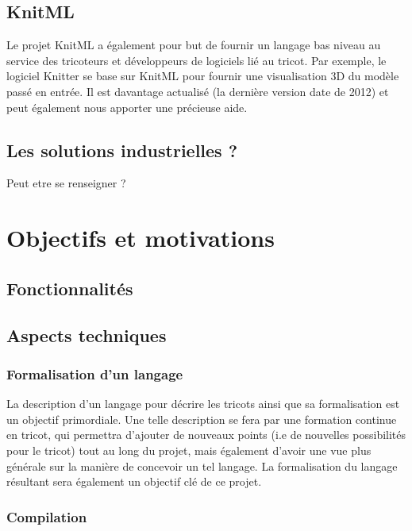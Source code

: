 \documentclass{article}
\begin{document}
\subsection{KnitML}

Le projet KnitML a également pour but de fournir un langage bas niveau au service des tricoteurs et développeurs de logiciels lié au
tricot. Par exemple, le logiciel Knitter se base sur KnitML pour fournir une visualisation 3D du modèle passé en entrée. Il est davantage
actualisé (la dernière version date de 2012) et peut également nous apporter une précieuse aide.

\subsection{Les solutions industrielles ?} Peut etre se renseigner ?

\section{Objectifs et motivations} %

\subsection{Fonctionnalités}

\subsection{Aspects techniques}


\subsubsection{Formalisation d'un langage}

La description d'un langage pour décrire les tricots ainsi que sa formalisation est un objectif primordiale.
Une telle description se fera par une formation continue en tricot, qui permettra d'ajouter de nouveaux points (i.e de nouvelles
possibilités pour le tricot) tout au long du projet, mais également d'avoir une vue plus générale sur la manière de concevoir un tel
langage. La formalisation du langage résultant sera également un objectif clé de ce projet.

\subsubsection{Compilation}
\end{document}
